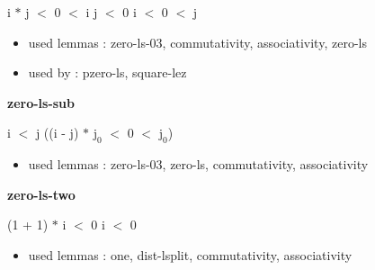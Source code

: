\documentclass[a4paper]{article}
\begin{document}
 \Fol i $*$ j $<$ 0  $<$ i \And j $<$ 0 \Or i $<$ 0  $<$ j

\begin{itemize}


\item       used lemmas  : zero-ls-03, commutativity, associativity, zero-ls
\item       used by      : pzero-ls, square-lez

\end{itemize}

\medskip

\bigskip

{\large\bf zero-ls-sub}

\medskip

 \Fol i $<$ j \Imp ((i - j) $*$ $\mbox{j}_{0}$ $<$ 0  $<$ $\mbox{j}_{0}$)

\begin{itemize}


\item       used lemmas  : zero-ls-03, zero-ls, commutativity, associativity

\end{itemize}

\medskip

\bigskip

{\large\bf zero-ls-two}

\medskip

 \Fol (1 + 1) $*$ i $<$ 0 \Equiv i $<$ 0

\begin{itemize}


\item       used lemmas  : one, dist-lsplit, commutativity, associativity

\end{itemize}

\medskip
\end{document}
